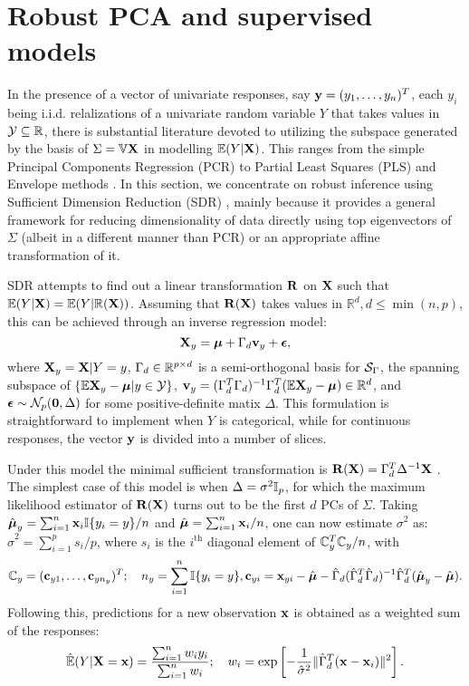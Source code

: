 \section{Robust PCA and supervised models}

In the presence of a vector of univariate responses, say ${\bf{y}} = (y_1,\ldots, y_n)^T$, each $y_i$ being i.i.d. relalizations of a univariate random variable $Y$ that takes values in $\mathcal{Y} \subseteq {\mathbb{R}}$, there is substantial literature devoted to utilizing the subspace generated by the basis of $\Sigma = {\mathbb{V}} {\mathbf{X}}$ in modelling ${\mathbb{E}}(Y|{\mathbf{X}})$. This ranges from the simple Principal Components Regression (PCR) to Partial Least Squares (PLS) and Envelope methods \citep{Cook10}. In this section, we concentrate on robust inference using Sufficient Dimension Reduction (SDR) \citep{AdragniCook09}, mainly because it provides a general framework for reducing dimensionality of data directly using top eigenvectors of $\Sigma$ (albeit in a different manner than PCR) or an appropriate affine transformation of it.

SDR attempts to find out a linear transformation ${\mathbf{R}}$ on ${\mathbf{X}}$ such that ${\mathbb{E}}(Y|{\mathbf{X}}) = {\mathbb{E}}(Y| {\mathbb{R}}({\mathbf{X}}))$. Assuming that ${\mathbf{R}}({\mathbf{X}})$ takes values in $\mathbb R^d, d \leq \min(n,p)$, this can be achieved through an inverse regression model:
%
\begin{equation}
{\mathbf{X}}_y = {\boldsymbol{\mu}} + \Gamma_d {\bf{v}}_y + {\boldsymbol{\epsilon}},
\end{equation}
%
where ${\mathbf{X}}_y = {\mathbf{X}}|Y=y$, $\Gamma_d \in {\mathbb{R}}^{p \times d}$ is a semi-orthogonal basis for $\mathcal{S}_\Gamma$, the spanning subspace of $\{ {\mathbb{E}} {\mathbf{X}}_y - {\boldsymbol{\mu}} | y \in \mathcal{Y} \}$, ${\bf{v}}_y = (\Gamma_d^T \Gamma_d)^{-1} \Gamma_d^T ({\mathbb{E}} {\mathbf{X}}_y - {\boldsymbol{\mu}}) \in \mathbb R^d$, and ${\boldsymbol{\epsilon}} \sim \mathcal{N}_p ({\bf 0}, \Delta)$ for some positive-definite matix $\Delta$. This formulation is straightforward to implement when $Y$ is categorical, while for continuous responses, the vector ${\bf{y}}$ is divided into a number of slices.

Under this model the minimal sufficient transformation is ${\mathbf{R}}({\mathbf{X}}) = \Gamma_d^T \Delta^{-1} {\mathbf{X}}$ \citep{AdragniCook09}. The simplest case of this model is when $\Delta = \sigma^2 {\mathbb{I}}_p$, for which the maximum likelihood estimator of $ {\mathbf{R}}({\mathbf{X}})$ turns out to be the first $d$ PCs of $\Sigma$. Taking $\hat {{\boldsymbol{\mu}}}_y = \sum_{i=1}^n {\bf{x}}_i {\mathbb{I}} \{y_i = y\}/n$ and $\hat {{\boldsymbol{\mu}}} = \sum_{i=1}^n {\bf{x}}_i /n$, one can now estimate $\sigma^2$ as: $\hat\sigma^2 = \sum_{i=1}^p s_i /p$, where $s_i$ is the $i^\text{th}$ diagonal element of ${\mathbb{C}}_y^T {\mathbb{C}}_y/n$, with
%
$$
{\mathbb{C}}_y = ({\bf{c}}_{y1}, \ldots, {\bf{c}}_{yn_y})^T; \quad
n_y = \sum_{i=1}^n {\mathbb{I}} \{ y_i = y \},
{\bf{c}}_{yi} = {\bf{x}}_{yi} - \hat {{\boldsymbol{\mu}}} - \hat\Gamma_d (\hat \Gamma_d^T \hat \Gamma_d)^{-1} \hat \Gamma_d^T (\hat {{\boldsymbol{\mu}}}_y - \hat {{\boldsymbol{\mu}}} ).
$$
%
Following this, predictions for a new observation ${\bf{x}}$ is obtained as a weighted sum of the responses:
%
$$
\hat {{\mathbb{E}}}(Y|{\mathbf{X}}={\bf{x}}) = \frac{\sum_{i=1}^n w_i y_i}{\sum_{i=1}^n w_i}; \quad w_i = \exp \left[ -\frac{1}{\hat\sigma^2}  \| \hat\Gamma_d^T ({\bf{x}} - {\bf{x}}_i) \|^2 \right].
$$
%

